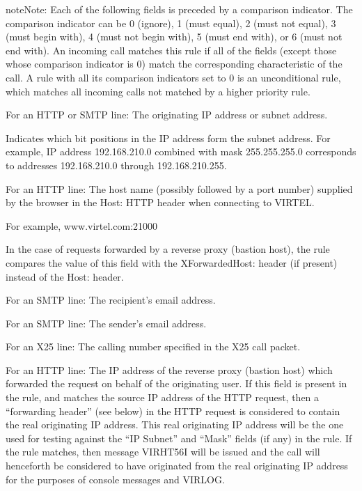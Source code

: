 \documentclass[letterpaper,10pt,english]{sphinxmanual}
\begin{document}
\begin{sphinxadmonition}{note}{Note:}
\sphinxAtStartPar
Each of the following fields is preceded by a comparison indicator. The comparison indicator can be 0 (ignore), 1 (must equal), 2 (must not equal), 3 (must begin with), 4 (must not begin with), 5 (must end with), or 6 (must not end with). An incoming call matches this rule if all of the fields (except those whose comparison indicator is 0) match the corresponding characteristic of the call. A rule with all its comparison indicators set to 0 is an unconditional rule, which matches all incoming calls not matched by a higher priority rule.
\end{sphinxadmonition}
\begin{description}
\sphinxAtStartPar
For an HTTP or SMTP line: The originating IP address or subnet address.

\sphinxAtStartPar
Indicates which bit positions in the IP address form the subnet address. For example, IP address 192.168.210.0 combined with mask 255.255.255.0 corresponds to addresses 192.168.210.0 through 192.168.210.255.

\sphinxAtStartPar
For an HTTP line: The host name (possibly followed by a port number) supplied by the browser in the Host: HTTP header when connecting to VIRTEL.

\sphinxAtStartPar
For example, www.virtel.com:21000

\sphinxAtStartPar
In the case of requests forwarded by a reverse proxy (bastion host), the rule compares the value of this field with the X\sphinxhyphen{}Forwarded\sphinxhyphen{}Host: header (if present) instead of the Host: header.

\sphinxAtStartPar
For an SMTP line: The recipient’s email address.

\sphinxAtStartPar
For an SMTP line: The sender’s email address.

\sphinxAtStartPar
For an X25 line: The calling number specified in the X25 call packet.

\sphinxAtStartPar
For an HTTP line: The IP address of the reverse proxy (bastion host) which forwarded the request on behalf of the originating user. If this field is present in the rule, and matches the source IP address of the HTTP request, then a “forwarding header” (see below) in the HTTP request is considered to contain the real originating IP address. This real originating IP address will be the one used for testing against the “IP Subnet” and “Mask” fields (if any) in the rule. If the rule matches, then message VIRHT56I will be issued and the call will henceforth be considered to have originated from the real originating IP address for the purposes of console messages and VIRLOG.


\end{description}
\end{document}
